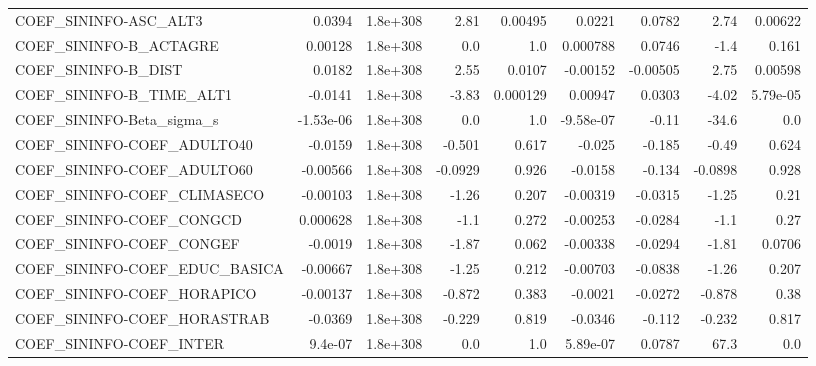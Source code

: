 \begin{tabular}{lrrrrrrrr}
COEF\_SININFO-ASC\_ALT3             &      0.0394 &     1.8e+308 &    2.81 &  0.00495 &     0.0221 &      0.0782 &         2.74 &       0.00622 \\
COEF\_SININFO-B\_ACTAGRE            &     0.00128 &     1.8e+308 &     0.0 &      1.0 &   0.000788 &      0.0746 &         -1.4 &         0.161 \\
COEF\_SININFO-B\_DIST               &      0.0182 &     1.8e+308 &    2.55 &   0.0107 &   -0.00152 &    -0.00505 &         2.75 &       0.00598 \\
COEF\_SININFO-B\_TIME\_ALT1          &     -0.0141 &     1.8e+308 &   -3.83 & 0.000129 &    0.00947 &      0.0303 &        -4.02 &      5.79e-05 \\
COEF\_SININFO-Beta\_sigma\_s         &   -1.53e-06 &     1.8e+308 &     0.0 &      1.0 &  -9.58e-07 &       -0.11 &        -34.6 &           0.0 \\
COEF\_SININFO-COEF\_ADULTO40        &     -0.0159 &     1.8e+308 &  -0.501 &    0.617 &     -0.025 &      -0.185 &        -0.49 &         0.624 \\
COEF\_SININFO-COEF\_ADULTO60        &    -0.00566 &     1.8e+308 & -0.0929 &    0.926 &    -0.0158 &      -0.134 &      -0.0898 &         0.928 \\
COEF\_SININFO-COEF\_CLIMASECO       &    -0.00103 &     1.8e+308 &   -1.26 &    0.207 &   -0.00319 &     -0.0315 &        -1.25 &          0.21 \\
COEF\_SININFO-COEF\_CONGCD          &    0.000628 &     1.8e+308 &    -1.1 &    0.272 &   -0.00253 &     -0.0284 &         -1.1 &          0.27 \\
COEF\_SININFO-COEF\_CONGEF          &     -0.0019 &     1.8e+308 &   -1.87 &    0.062 &   -0.00338 &     -0.0294 &        -1.81 &        0.0706 \\
COEF\_SININFO-COEF\_EDUC\_BASICA     &    -0.00667 &     1.8e+308 &   -1.25 &    0.212 &   -0.00703 &     -0.0838 &        -1.26 &         0.207 \\
COEF\_SININFO-COEF\_HORAPICO        &    -0.00137 &     1.8e+308 &  -0.872 &    0.383 &    -0.0021 &     -0.0272 &       -0.878 &          0.38 \\
COEF\_SININFO-COEF\_HORASTRAB       &     -0.0369 &     1.8e+308 &  -0.229 &    0.819 &    -0.0346 &      -0.112 &       -0.232 &         0.817 \\
COEF\_SININFO-COEF\_INTER           &     9.4e-07 &     1.8e+308 &     0.0 &      1.0 &   5.89e-07 &      0.0787 &         67.3 &           0.0 \\

\end{tabular}
